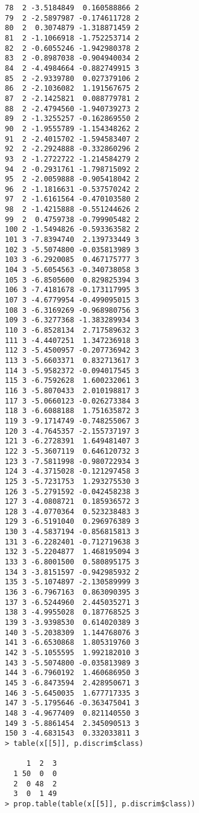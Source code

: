 \begin{enumerate}
\begin{lstlisting}
78  2 -3.5184849  0.160588866 2
79  2 -2.5897987 -0.174611728 2
80  2  0.3074879 -1.318871459 2
81  2 -1.1066918 -1.752253714 2
82  2 -0.6055246 -1.942980378 2
83  2 -0.8987038 -0.904940034 2
84  2 -4.4984664 -0.882749915 3
85  2 -2.9339780  0.027379106 2
86  2 -2.1036082  1.191567675 2
87  2 -2.1425821  0.088779781 2
88  2 -2.4794560 -1.940739273 2
89  2 -1.3255257 -0.162869550 2
90  2 -1.9555789 -1.154348262 2
91  2 -2.4015702 -1.594583407 2
92  2 -2.2924888 -0.332860296 2
93  2 -1.2722722 -1.214584279 2
94  2 -0.2931761 -1.798715092 2
95  2 -2.0059888 -0.905418042 2
96  2 -1.1816631 -0.537570242 2
97  2 -1.6161564 -0.470103580 2
98  2 -1.4215888 -0.551244626 2
99  2  0.4759738 -0.799905482 2
100 2 -1.5494826 -0.593363582 2
101 3 -7.8394740  2.139733449 3
102 3 -5.5074800 -0.035813989 3
103 3 -6.2920085  0.467175777 3
104 3 -5.6054563 -0.340738058 3
105 3 -6.8505600  0.829825394 3
106 3 -7.4181678 -0.173117995 3
107 3 -4.6779954 -0.499095015 3
108 3 -6.3169269 -0.968980756 3
109 3 -6.3277368 -1.383289934 3
110 3 -6.8528134  2.717589632 3
111 3 -4.4407251  1.347236918 3
112 3 -5.4500957 -0.207736942 3
113 3 -5.6603371  0.832713617 3
114 3 -5.9582372 -0.094017545 3
115 3 -6.7592628  1.600232061 3
116 3 -5.8070433  2.010198817 3
117 3 -5.0660123 -0.026273384 3
118 3 -6.6088188  1.751635872 3
119 3 -9.1714749 -0.748255067 3
120 3 -4.7645357 -2.155737197 3
121 3 -6.2728391  1.649481407 3
122 3 -5.3607119  0.646120732 3
123 3 -7.5811998 -0.980722934 3
124 3 -4.3715028 -0.121297458 3
125 3 -5.7231753  1.293275530 3
126 3 -5.2791592 -0.042458238 3
127 3 -4.0808721  0.185936572 3
128 3 -4.0770364  0.523238483 3
129 3 -6.5191040  0.296976389 3
130 3 -4.5837194 -0.856815813 3
131 3 -6.2282401 -0.712719638 3
132 3 -5.2204877  1.468195094 3
133 3 -6.8001500  0.580895175 3
134 3 -3.8151597 -0.942985932 2
135 3 -5.1074897 -2.130589999 3
136 3 -6.7967163  0.863090395 3
137 3 -6.5244960  2.445035271 3
138 3 -4.9955028  0.187768525 3
139 3 -3.9398530  0.614020389 3
140 3 -5.2038309  1.144768076 3
141 3 -6.6530868  1.805319760 3
142 3 -5.1055595  1.992182010 3
143 3 -5.5074800 -0.035813989 3
144 3 -6.7960192  1.460686950 3
145 3 -6.8473594  2.428950671 3
146 3 -5.6450035  1.677717335 3
147 3 -5.1795646 -0.363475041 3
148 3 -4.9677409  0.821140550 3
149 3 -5.8861454  2.345090513 3
150 3 -4.6831543  0.332033811 3
> table(x[[5]], p.discrim$class)
   
     1  2  3
  1 50  0  0
  2  0 48  2
  3  0  1 49
> prop.table(table(x[[5]], p.discrim$class))
   

\end{lstlisting}
\end{enumerate}
